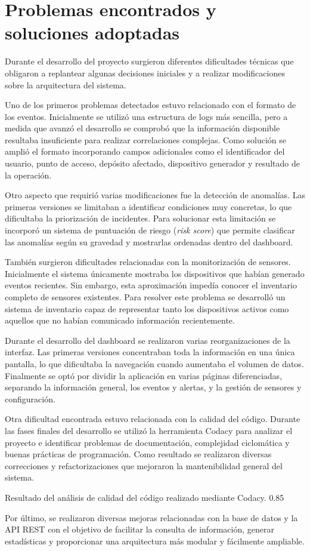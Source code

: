 \section{Problemas encontrados y soluciones adoptadas}

Durante el desarrollo del proyecto surgieron diferentes dificultades técnicas que obligaron a replantear algunas decisiones iniciales y a realizar modificaciones sobre la arquitectura del sistema.

Uno de los primeros problemas detectados estuvo relacionado con el formato de los eventos. Inicialmente se utilizó una estructura de logs más sencilla, pero a medida que avanzó el desarrollo se comprobó que la información disponible resultaba insuficiente para realizar correlaciones complejas. Como solución se amplió el formato incorporando campos adicionales como el identificador del usuario, punto de acceso, depósito afectado, dispositivo generador y resultado de la operación.

Otro aspecto que requirió varias modificaciones fue la detección de anomalías. Las primeras versiones se limitaban a identificar condiciones muy concretas, lo que dificultaba la priorización de incidentes. Para solucionar esta limitación se incorporó un sistema de puntuación de riesgo (\textit{risk score}) que permite clasificar las anomalías según su gravedad y mostrarlas ordenadas dentro del dashboard.

También surgieron dificultades relacionadas con la monitorización de sensores. Inicialmente el sistema únicamente mostraba los dispositivos que habían generado eventos recientes. Sin embargo, esta aproximación impedía conocer el inventario completo de sensores existentes. Para resolver este problema se desarrolló un sistema de inventario capaz de representar tanto los dispositivos activos como aquellos que no habían comunicado información recientemente.

Durante el desarrollo del dashboard se realizaron varias reorganizaciones de la interfaz. Las primeras versiones concentraban toda la información en una única pantalla, lo que dificultaba la navegación cuando aumentaba el volumen de datos. Finalmente se optó por dividir la aplicación en varias páginas diferenciadas, separando la información general, los eventos y alertas, y la gestión de sensores y configuración.

Otra dificultad encontrada estuvo relacionada con la calidad del código. Durante las fases finales del desarrollo se utilizó la herramienta Codacy para analizar el proyecto e identificar problemas de documentación, complejidad ciclomática y buenas prácticas de programación. Como resultado se realizaron diversas correcciones y refactorizaciones que mejoraron la mantenibilidad general del sistema.

{Resultado del análisis de calidad del código realizado mediante Codacy.}
{0.85}

Por último, se realizaron diversas mejoras relacionadas con la base de datos y la API REST con el objetivo de facilitar la consulta de información, generar estadísticas y proporcionar una arquitectura más modular y fácilmente ampliable.
